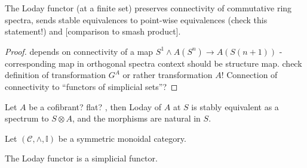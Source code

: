     \begin{lem}\label{lem_loday_functor_preserves_connectivity}
      The Loday functor (at a finite set) preserves connectivity of commutative ring spectra, sends stable equivalences to point-wise equivalences (check this statement!) and [comparison to smash product].
      \begin{proof}
        depends on connectivity of a map $S^1 \wedge A(S^n) \to A(S(n+1))$ - corresponding map in orthogonal spectra context should be structure map. check definition of transformation $G^A$ or rather transformation $A$! Connection of connectivity to ``functors of simplicial sets''?
      \end{proof}
    \end{lem}
    \begin{cor}\label{cor_loday_at_S_naturally_equivalent_to_tensor_with_S}
      Let $A$ be a cofibrant? flat? \hring, then Loday of $A$ at $S$ is stably equivalent as a spectrum to $S \otimes A$, and the morphisms are natural in $S$.
    \end{cor}
    \begin{defn}\label{def_loday_functor_in_symmetric_monoidal_category} 
      Let $(\mathcal{C},\wedge, \mathbb{I})$ be a symmetric monoidal category.\\
    \end{defn}
    \begin{lem}\label{lem_loday_functor_is_simplicial}
      The Loday functor is a simplicial functor.\\
    \end{lem}
